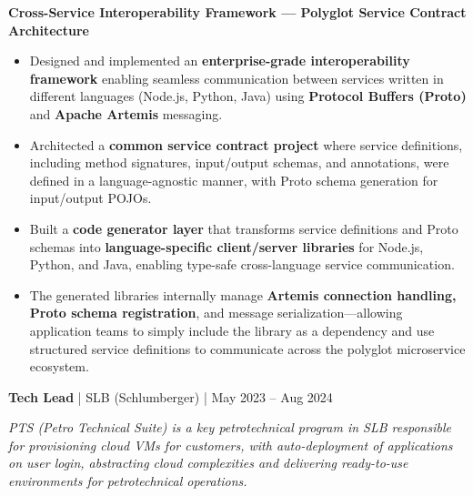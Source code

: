 \documentclass[a4paper,11pt]{article}
\newcommand{\jobtitle}[4]{
  \vspace{6pt}
  {\textbf{\textcolor{accent}{#1}} | #2 | #3}
  \vspace{2pt}
}
\begin{document}
\vspace{4pt}
\textbf{Cross-Service Interoperability Framework --- Polyglot Service Contract Architecture}
\begin{itemize}[leftmargin=*, nosep]
  \item Designed and implemented an \textbf{enterprise-grade interoperability framework} enabling seamless communication between services written in different languages (Node.js, Python, Java) using \textbf{Protocol Buffers (Proto)} and \textbf{Apache Artemis} messaging.
  \item Architected a \textbf{common service contract project} where service definitions, including method signatures, input/output schemas, and annotations, were defined in a language-agnostic manner, with Proto schema generation for input/output POJOs.
  \item Built a \textbf{code generator layer} that transforms service definitions and Proto schemas into \textbf{language-specific client/server libraries} for Node.js, Python, and Java, enabling type-safe cross-language service communication.
  \item The generated libraries internally manage \textbf{Artemis connection handling, Proto schema registration}, and message serialization---allowing application teams to simply include the library as a dependency and use structured service definitions to communicate across the polyglot microservice ecosystem.
\end{itemize}

\vspace{8pt}
\jobtitle{Tech Lead}{SLB (Schlumberger)}{May 2023 -- Aug 2024}{}

\textit{PTS (Petro Technical Suite) is a key petrotechnical program in SLB responsible for provisioning cloud VMs for customers, with auto-deployment of applications on user login, abstracting cloud complexities and delivering ready-to-use environments for petrotechnical operations.}
\end{document}
